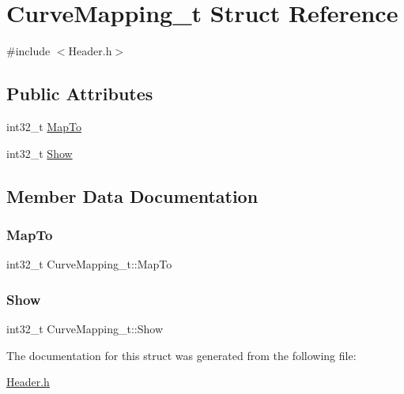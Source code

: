 \hypertarget{struct_curve_mapping__t}{}\section{Curve\+Mapping\+\_\+t Struct Reference}
\label{struct_curve_mapping__t}


{\ttfamily \#include $<$Header.\+h$>$}

\subsection*{Public Attributes}
\begin{DoxyCompactItemize}
\item 
int32\+\_\+t \hyperlink{struct_curve_mapping__t_a9297faa73e4f0682e80cc96bfb2fad5a}{Map\+To}
\item 
int32\+\_\+t \hyperlink{struct_curve_mapping__t_a37f717372240c8fd4c4dfacfcfe33234}{Show}
\end{DoxyCompactItemize}


\subsection{Member Data Documentation}
\mbox{\label{struct_curve_mapping__t_a9297faa73e4f0682e80cc96bfb2fad5a}} 
\subsubsection{\texorpdfstring{Map\+To}{MapTo}}
{\footnotesize\ttfamily int32\+\_\+t Curve\+Mapping\+\_\+t\+::\+Map\+To}

\mbox{\label{struct_curve_mapping__t_a37f717372240c8fd4c4dfacfcfe33234}} 
\subsubsection{\texorpdfstring{Show}{Show}}
{\footnotesize\ttfamily int32\+\_\+t Curve\+Mapping\+\_\+t\+::\+Show}



The documentation for this struct was generated from the following file\+:\begin{DoxyCompactItemize}
\item 
\hyperlink{_header_8h}{Header.\+h}\end{DoxyCompactItemize}
